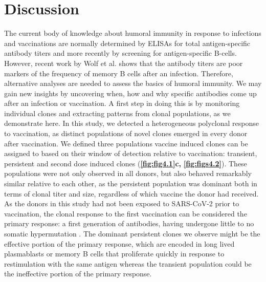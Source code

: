 \section{Discussion}
The current body of knowledge about humoral immunity in response to infections and vaccinations are normally determined by ELISAs for total antigen-specific antibody titers and more recently by screening for antigen-specific B-cells. However, recent work by Wolf et al. \cite{wolf2022antibody} shows that the antibody titers are poor markers of the frequency of memory B cells after an infection. Therefore, alternative analyses are needed to assess the basics of humoral immunity. We may gain new insights by uncovering when, how and why specific antibodies come up after an infection or vaccination. A first step in doing this is by monitoring individual clones and extracting patterns from clonal populations, as we demonstrate here.
In this study, we detected a heterogeneous polyclonal response to vaccination, as distinct populations of novel clones emerged in every donor after vaccination. We defined three populations vaccine induced clones can be assigned to based on their window of detection relative to vaccination: transient, persistent and second dose induced clones (\textbf{\autoref{fig:fig4.1}c,} \textbf{\autoref{fig:figs4.2}}). These populations were not only observed in all donors, but also behaved remarkably similar relative to each other, as the persistent population was dominant both in terms of clonal titer and size, regardless of which vaccine the donor had received.
As the donors in this study had not been exposed to SARS-CoV-2 prior to vaccination, the clonal response to the first vaccination can be considered the primary response: a first generation of antibodies, having undergone little to no somatic hypermutation \cite{charlesajaneway2001immunological}. The dominant persistent clones we observe might be the effective portion of the primary response, which are encoded in long lived plasmablasts or memory B cells that proliferate quickly in response to restimulation with the same antigen whereas the transient population could be the ineffective portion of the primary response.

